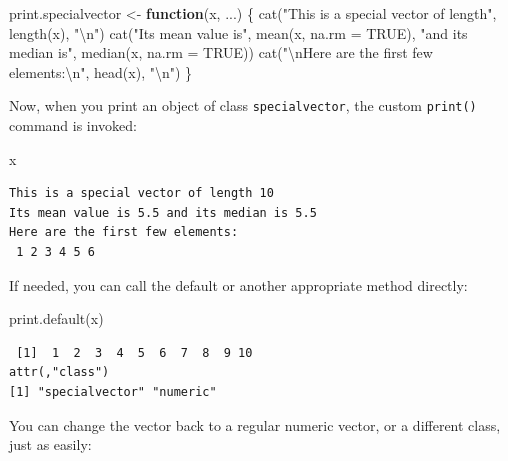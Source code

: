 \documentclass[
]{book}
\newenvironment{Shaded}{\begin{snugshade}}{\end{snugshade}}
\newcommand{\AttributeTok}[1]{\textcolor[rgb]{0.77,0.63,0.00}{#1}}
\newcommand{\ConstantTok}[1]{\textcolor[rgb]{0.00,0.00,0.00}{#1}}
\newcommand{\ControlFlowTok}[1]{\textcolor[rgb]{0.13,0.29,0.53}{\textbf{#1}}}
\newcommand{\FunctionTok}[1]{\textcolor[rgb]{0.00,0.00,0.00}{#1}}
\newcommand{\NormalTok}[1]{#1}
\newcommand{\OtherTok}[1]{\textcolor[rgb]{0.56,0.35,0.01}{#1}}
\newcommand{\SpecialCharTok}[1]{\textcolor[rgb]{0.00,0.00,0.00}{#1}}
\newcommand{\StringTok}[1]{\textcolor[rgb]{0.31,0.60,0.02}{#1}}
\begin{document}
\begin{Shaded}
\begin{Highlighting}[]
\NormalTok{print.specialvector }\OtherTok{\textless{}{-}} \ControlFlowTok{function}\NormalTok{(x, ...) \{}
  \FunctionTok{cat}\NormalTok{(}\StringTok{"This is a special vector of length"}\NormalTok{, }\FunctionTok{length}\NormalTok{(x), }\StringTok{"}\SpecialCharTok{\textbackslash{}n}\StringTok{"}\NormalTok{)}
  \FunctionTok{cat}\NormalTok{(}\StringTok{"Its mean value is"}\NormalTok{, }\FunctionTok{mean}\NormalTok{(x, }\AttributeTok{na.rm =} \ConstantTok{TRUE}\NormalTok{), }\StringTok{"and its median is"}\NormalTok{, }\FunctionTok{median}\NormalTok{(x, }\AttributeTok{na.rm =} \ConstantTok{TRUE}\NormalTok{))}
  \FunctionTok{cat}\NormalTok{(}\StringTok{"}\SpecialCharTok{\textbackslash{}n}\StringTok{Here are the first few elements:}\SpecialCharTok{\textbackslash{}n}\StringTok{"}\NormalTok{, }\FunctionTok{head}\NormalTok{(x), }\StringTok{"}\SpecialCharTok{\textbackslash{}n}\StringTok{"}\NormalTok{)}
\NormalTok{\}}
\end{Highlighting}
\end{Shaded}

Now, when you print an object of class \texttt{specialvector}, the custom \texttt{print()} command is invoked:

\begin{Shaded}
\begin{Highlighting}[]
\NormalTok{x}
\end{Highlighting}
\end{Shaded}

\begin{verbatim}
This is a special vector of length 10 
Its mean value is 5.5 and its median is 5.5
Here are the first few elements:
 1 2 3 4 5 6 
\end{verbatim}

If needed, you can call the default or another appropriate method directly:

\begin{Shaded}
\begin{Highlighting}[]
\FunctionTok{print.default}\NormalTok{(x)}
\end{Highlighting}
\end{Shaded}

\begin{verbatim}
 [1]  1  2  3  4  5  6  7  8  9 10
attr(,"class")
[1] "specialvector" "numeric"      
\end{verbatim}

You can change the vector back to a regular numeric vector, or a different class, just as easily:
\end{document}
